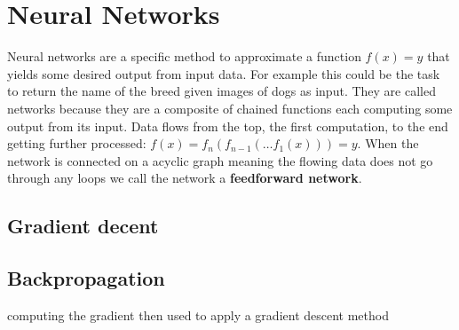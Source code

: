 \section{Neural Networks}
\label{sec:concepts:nn}
Neural networks are a specific method to approximate a function $f(x) = y$ that yields some desired output from input data. For example this could be the task to return the name of the breed given images of dogs as input. They are called networks because they are a composite of chained functions each computing some output from its input. Data flows from the top, the first computation, to the end getting further processed: $f(x) = f_n(f_{n-1}(\dots f_1(x))) = y$. When the network is connected on a acyclic graph meaning the flowing data does not go through any loops we call the network a \textbf{feedforward network}.

\subsection{Gradient decent}
\label{sub:concepts:nn:gd}

\subsection{Backpropagation}
\label{sub:concepts:nn:backprob}
\citet{rumelhart_learning_1988}
computing the gradient then used to apply a gradient descent method

